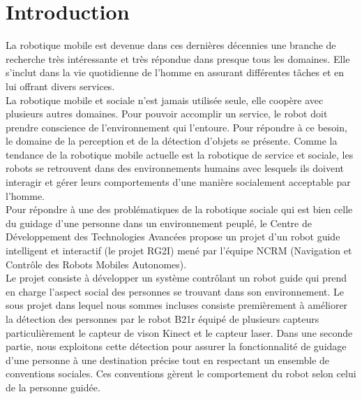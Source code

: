 \chapter*{Introduction}%
\label{Chapter3} %

\tab La robotique mobile est devenue dans ces dernières décennies une branche de recherche très intéressante et très répondue dans presque tous les domaines. Elle s'inclut dans la vie quotidienne de l'homme en assurant différentes tâches et en lui offrant divers services.\vspace{5px}\\
\tab La robotique mobile et sociale n'est jamais utilisée seule, elle coopère avec plusieurs autres domaines. Pour pouvoir accomplir un service, le robot doit prendre conscience de l'environnement qui l'entoure. Pour répondre à ce besoin, le domaine de la perception et de la détection d'objets se présente. Comme la tendance de la robotique mobile actuelle est la robotique de service et sociale, les robots se retrouvent dans des environnements humains avec lesquels ils doivent interagir et gérer leurs comportements d'une manière socialement acceptable par l'homme.\vspace{5px}\\
\tab Pour répondre à une des problématiques de la robotique sociale qui est bien celle du guidage d'une personne dans un environnement peuplé, le Centre de Développement des Technologies Avancées propose un projet d'un robot guide intelligent et interactif (le projet RG2I) mené par l'équipe NCRM (Navigation et Contrôle des Robots Mobiles Autonomes).\vspace{5px} \\
\tab Le projet consiste à développer un système contrôlant un robot guide qui prend en charge l'aspect social des personnes se trouvant dans son environnement. Le sous projet dans lequel nous sommes incluses consiste premièrement à améliorer la détection des personnes par le robot B21r équipé de plusieurs capteurs particulièrement le capteur de vison Kinect et le capteur laser. Dans une seconde partie, nous exploitons cette détection pour assurer la fonctionnalité de guidage d'une personne à une destination précise tout en respectant un ensemble de conventions sociales. Ces conventions gèrent le comportement du robot selon celui de la personne guidée.\vspace{5px}\\

